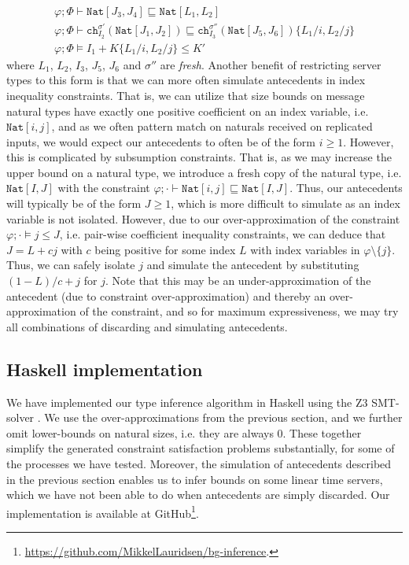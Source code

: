 \begin{align*}
    \varphi;\Phi\vdash \texttt{Nat}[J_3,J_4] \sqsubseteq \texttt{Nat}[L_1,L_2]\\
    \varphi;\Phi\vdash \texttt{ch}^{\sigma'}_{I_2}(\texttt{Nat}[J_1,J_2]) \sqsubseteq \texttt{ch}^{\sigma''}_{I_3}(\texttt{Nat}[J_5,J_6])\{L_1/i, L_2/j\}\\
    \varphi;\Phi\vDash I_1 + K\{L_1/i,L_2/j\} \leq K'
\end{align*}
where $L_1$, $L_2$, $I_3$, $J_5$, $J_6$ and $\sigma''$ are \textit{fresh}. Another benefit of restricting server types to this form is that we can more often simulate antecedents in index inequality constraints. That is, we can utilize that size bounds on message natural types have exactly one positive coefficient on an index variable, i.e. $\texttt{Nat}[i,j]$, and as we often pattern match on naturals received on replicated inputs, we would expect our antecedents to often be of the form $i\geq 1$. However, this is complicated by subsumption constraints. That is, as we may increase the upper bound on a natural type, we introduce a fresh copy of the natural type, i.e. $\texttt{Nat}[I,J]$ with the constraint  $\varphi;\cdot\vdash \texttt{Nat}[i,j] \sqsubseteq \texttt{Nat}[I,J]$. Thus, our antecedents will typically be of the form $J \geq 1$, which is more difficult to simulate as an index variable is not isolated. However, due to our over-approximation of the constraint $\varphi;\cdot\vDash j \leq J$, i.e. pair-wise coefficient inequality constraints, we can deduce that $J = L + cj$ with $c$ being positive for some index $L$ with index variables in $\varphi\setminus\{j\}$. Thus, we can safely isolate $j$ and simulate the antecedent by substituting $(1-L)/c + j$ for $j$. Note that this may be an under-approximation of the antecedent (due to constraint over-approximation) and thereby an over-approximation of the constraint, and so for maximum expressiveness, we may try all combinations of discarding and simulating antecedents.
%
\subsection{Haskell implementation}

We have implemented our type inference algorithm in Haskell using the Z3 SMT-solver \cite{Z3}. We use the over-approximations from the previous section, and we further omit lower-bounds on natural sizes, i.e. they are always 0. These together simplify the generated constraint satisfaction problems substantially, for some of the processes we have tested. Moreover, the simulation of antecedents described in the previous section enables us to infer bounds on some linear time servers, which we have not been able to do when antecedents are simply discarded. Our implementation is available at GitHub\footnote{\url{https://github.com/MikkelLauridsen/bg-inference}.}. \\

